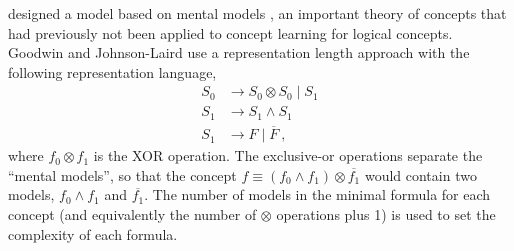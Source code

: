 \documentclass[doc,floatsintext]{apa6}
\begin{document}
\citet{goodwinj2011} designed a model based on mental models \citep{johnsonlaird1983}, an important theory of concepts that had previously not been applied to concept learning for logical concepts.
Goodwin and Johnson-Laird use a representation length approach with the following representation language,
%
\begin{align*}
  S_0 &\rightarrow S_0 \otimes S_0 \mid S_1\\
  S_1 &\rightarrow S_1 \wedge S_1 \\
  S_1 &\rightarrow F \mid \overline{F} ~,
\end{align*}
%
where $f_0 \otimes f_1$ is the XOR operation.
The exclusive-or operations separate the ``mental models'', so that the concept $f \equiv (f_0 \wedge f_1) \otimes \overline{f_1}$ would contain two models, $f_0 \wedge f_1$ and $\overline{f_1}$.
The number of models in the minimal formula for each concept (and equivalently the number of $\otimes$ operations plus 1) is used to set the complexity of each formula.
\end{document}
